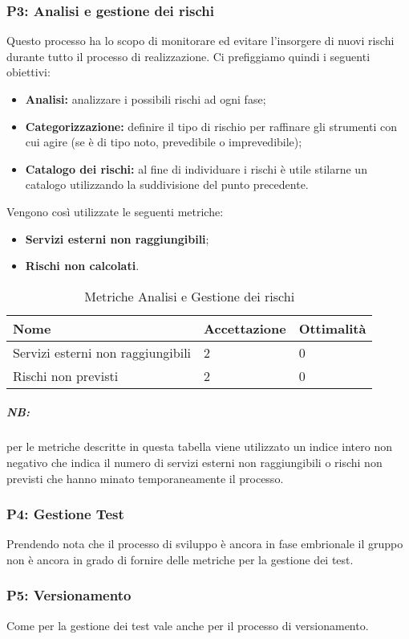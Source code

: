 \subsubsection{P3: Analisi e gestione dei rischi}
Questo processo ha lo scopo di monitorare ed evitare l'insorgere di nuovi rischi durante tutto il processo di realizzazione. Ci prefiggiamo quindi i seguenti obiettivi:
\begin{itemize}
	\item{\textbf{Analisi:} analizzare i possibili rischi ad ogni fase;}
	\item{\textbf{Categorizzazione:}  definire il tipo di rischio per raffinare gli strumenti con cui agire (se è di tipo noto, prevedibile o imprevedibile);}
	\item{\textbf{Catalogo dei rischi:} al fine di individuare i rischi è utile stilarne un catalogo utilizzando la suddivisione del punto precedente.}
\end{itemize}
Vengono così utilizzate le seguenti metriche: 
\begin{itemize}
	\item{\textbf{Servizi esterni non raggiungibili};}
	\item{\textbf{Rischi non calcolati}.}
\end{itemize}
\begin{table}[!htbp]
	\centering
	\renewcommand{\arraystretch}{2} 
		\begin{tabular}{|l|l|l|}
			\rowcolor{orange!50}
			\hline
			Nome & Accettazione & Ottimalità \\
			\hline
			Servizi esterni non raggiungibili & 2 & 0 \\
			\hline
			Rischi non previsti & 2 & 0 \\
			\hline
		\end{tabular}
	\caption{Metriche Analisi e Gestione dei rischi}
\end{table}
\subparagraph{\textbf{NB}:} per le metriche descritte in questa tabella viene utilizzato un indice intero non negativo che indica il numero di servizi esterni non raggiungibili o rischi non previsti che hanno minato temporaneamente il processo.
\newpage
\subsubsection{P4: Gestione Test}
Prendendo nota che il processo di sviluppo è ancora in fase embrionale il gruppo non è ancora in grado di fornire delle metriche per la gestione dei test.
\subsubsection{P5: Versionamento}
Come per la gestione dei test vale anche per il processo di versionamento.
